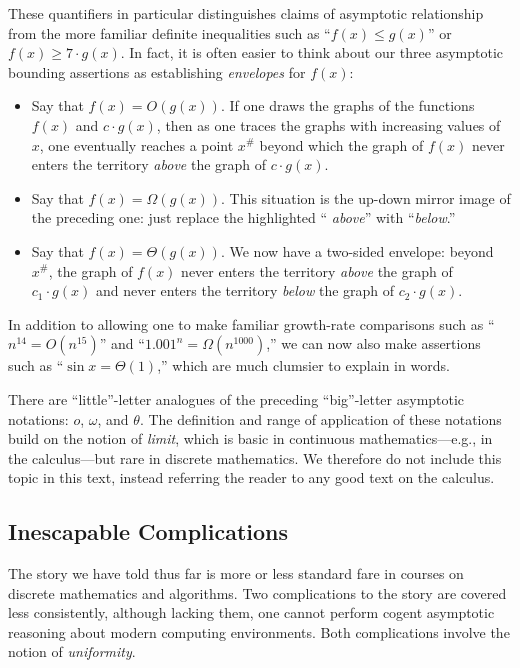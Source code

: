 These quantifiers in particular distinguishes claims of asymptotic
relationship from the more familiar definite inequalities such as
``$f(x) \leq g(x)$'' or $f(x) \geq 7 \cdot g(x)$.  In fact, it is
often easier to think about our three asymptotic bounding assertions
as establishing {\em envelopes} for $f(x)$:
\begin{itemize}
\item
Say that $f(x) = O(g(x))$.  If one draws the graphs of the functions
$f(x)$ and $c \cdot g(x)$, then as one traces the graphs with
increasing values of $x$, one eventually reaches a point $x^{\#}$
beyond which the graph of $f(x)$ never enters the territory {\em
  above} the graph of $c \cdot g(x)$.
\item
Say that $f(x) = \Omega(g(x))$.  This situation is the up-down mirror
image of the preceding one: just replace the highlighted ``{\em
above}'' with ``{\em below}.''
\item
Say that $f(x) = \Theta(g(x))$.  We now have a two-sided envelope:
beyond $x^{\#}$, the graph of $f(x)$ never enters the territory {\em
  above} the graph of $c_1 \cdot g(x)$ and never enters the territory
{\em below} the graph of $c_2 \cdot g(x)$.
\end{itemize}
In addition to allowing one to make familiar growth-rate comparisons
such as ``$n^{14} = O(n^{15})$'' and ``$1.001^n = \Omega(n^{1000})$,''
we can now also make assertions such as ``$\sin x = \Theta(1)$,''
which are much clumsier to explain in words.

\medskip

%
There are ``little''-letter analogues of the preceding ``big''-letter
asymptotic notations: $o$, $\omega$, and $\theta$.  The definition and
range of application of these notations build on the notion of {\it
  limit}, which is basic in continuous mathematics---e.g., in the
calculus---but rare in discrete mathematics.  We therefore do not
include this topic in this text, instead referring the reader to any
good text on the calculus.

\subsection{Inescapable Complications}
\label{sec:asymptotic-complication}

The story we have told thus far is more or less standard fare in
courses on discrete mathematics and algorithms.  Two complications to
the story are covered less consistently, although lacking them, one
cannot perform cogent asymptotic reasoning about modern computing
environments.  Both complications involve the notion of {\em
  uniformity}. 

